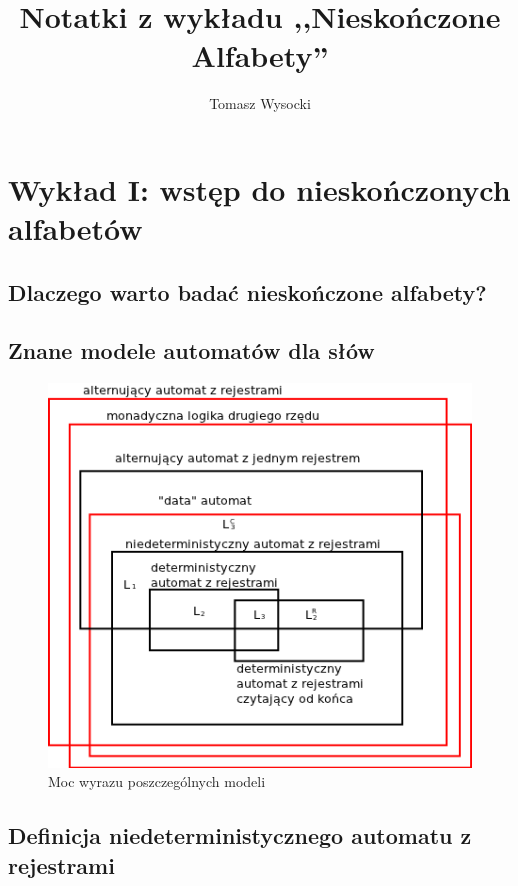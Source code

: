 \documentclass[a4paper,12pt]{report}
\title{Notatki z wykładu ,,Nieskończone Alfabety''}
\author{Tomasz Wysocki}
\begin{document}
\maketitle
\newpage
\tableofcontents
\newpage
\chapter {Wykład I: wstęp do nieskończonych alfabetów}
\section {Dlaczego warto badać nieskończone alfabety?}
\section {Znane modele automatów dla słów}
\begin{figure}
\begin{center}
\includegraphics{images/podzial_automatow.png}
\end{center}
\caption{Moc wyrazu poszczególnych modeli}
\end{figure}

\section {Definicja niedeterministycznego automatu z rejestrami}
\end{document}
